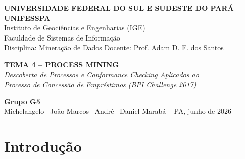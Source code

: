 \documentclass[12pt,a4paper]{article}
\begin{document}
\begin{titlepage}
\centering\vspace*{0.5cm}
{\large\bfseries UNIVERSIDADE FEDERAL DO SUL E SUDESTE DO PARÁ -- UNIFESSPA}\\[0.2cm]
{\normalsize Instituto de Geociências e Engenharias (IGE)}\\
{\normalsize Faculdade de Sistemas de Informação}\\[0.4cm]
{\normalsize Disciplina: Mineração de Dados \quad Docente: Prof. Adam D. F. dos Santos}
\vspace{3cm}

{\LARGE\bfseries TEMA 4 -- PROCESS MINING}\\[0.5cm]
{\large\itshape Descoberta de Processos e Conformance Checking Aplicados ao\\[0.15cm]
Processo de Concessão de Empréstimos (BPI Challenge 2017)}
\vspace{3cm}

{\large\bfseries Grupo G5}\\[0.3cm]
{\normalsize Michelangelo \textbullet\ João Marcos \textbullet\ André \textbullet\ Daniel}
\vfill
{\normalsize Marabá -- PA, junho de 2026}
\end{titlepage}

\begin{abstract}
\noindent
Este trabalho aplica técnicas de \textit{Process Mining} ao processo de concessão de empréstimos do BPI Challenge 2017 \cite{vanDongen2017}, cobrindo descoberta de processos (Alpha Miner e Inductive Miner), \textit{conformance checking} (fitness, precision, generalization, simplicity) e análise de gargalos. Por restrições de rede no ambiente de execução, foi construído um log sintético fiel à estrutura do BPI17 (3.000 casos, 54.597 eventos, 23 atividades), e os algoritmos foram implementados em Python puro. Os resultados revelam o clássico trade-off \textit{fitness}/\textit{precision} no Inductive Miner, identificam as etapas de validação manual e contato pós-oferta como os principais gargalos (espera média superior a 25 horas) e registram 169 variantes distintas de execução.

\medskip\noindent\textbf{Palavras-chave:} Process Mining; Conformance Checking; Alpha Miner; Inductive Miner; BPI Challenge 2017.
\end{abstract}

\newpage
\tableofcontents
\newpage

\section{Introdução}
\end{document}
